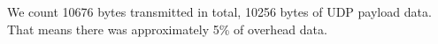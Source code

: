 We count 10676 bytes transmitted in total, 10256 bytes of UDP payload data. That means there was approximately 5\% of overhead data.